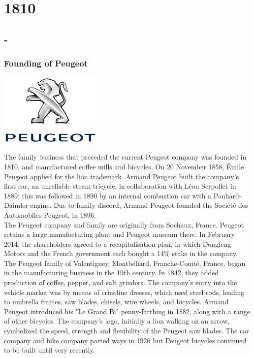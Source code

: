 \documentclass[11pt]{report}
\begin{document}
\chapter{1810}
\section{-}
\subsection{Founding of Peugeot}
\vspace{2mm}\begin{center}\includegraphics[width=5cm]{./img/peugeotLogo.jpg}\end{center}
The family business that preceded the current Peugeot company was founded in 1810, and manufactured coffee mills and bicycles. On 20 November 1858, Émile Peugeot applied for the lion trademark. Armand Peugeot built the company's first car, an unreliable steam tricycle, in collaboration with Léon Serpollet in 1889; this was followed in 1890 by an internal combustion car with a Panhard-Daimler engine. Due to family discord, Armand Peugeot founded the Société des Automobiles Peugeot, in 1896.\\
\indent The Peugeot company and family are originally from Sochaux, France. Peugeot retains a large manufacturing plant and Peugeot museum there. In February 2014, the shareholders agreed to a recapitalisation plan, in which Dongfeng Motors and the French government each bought a 14\% stake in the company.\\ \indent The Peugeot family of Valentigney, Montbéliard, Franche-Comté, France, began in the manufacturing business in the 19th century. In 1842, they added production of coffee, pepper, and salt grinders. The company's entry into the vehicle market was by means of crinoline dresses, which used steel rods, leading to umbrella frames, saw blades, chisels, wire wheels, and bicycles. Armand Peugeot introduced his "Le Grand Bi" penny-farthing in 1882, along with a range of other bicycles. The company's logo, initially a lion walking on an arrow, symbolized the speed, strength and flexibility of the Peugeot saw blades. The car company and bike company parted ways in 1926 but Peugeot bicycles continued to be built until very recently.
\end{document}
